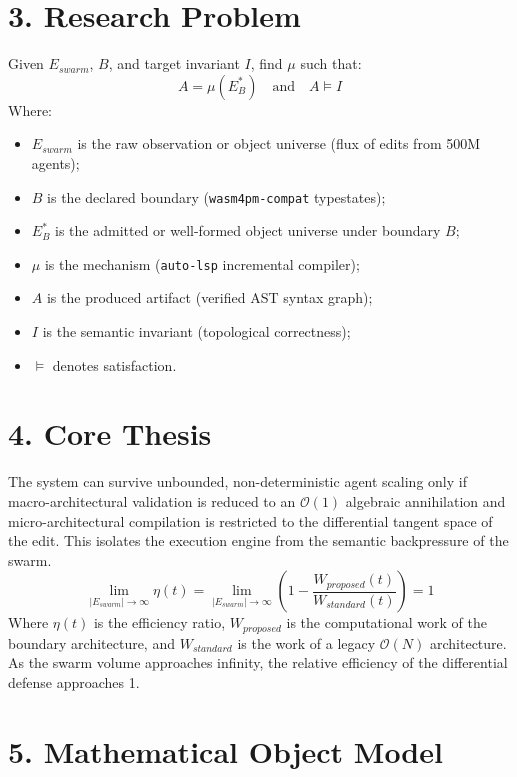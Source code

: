 \section{3. Research Problem}
Given $E_{swarm}$, $B$, and target invariant $I$, find $\mu$ such that:
\begin{equation}
A = \mu(E_B^*) \quad \text{and} \quad A \models I
\end{equation}
Where:
\begin{itemize}
    \item $E_{swarm}$ is the raw observation or object universe (flux of edits from 500M agents);
    \item $B$ is the declared boundary (\texttt{wasm4pm-compat} typestates);
    \item $E_B^*$ is the admitted or well-formed object universe under boundary $B$;
    \item $\mu$ is the mechanism (\texttt{auto-lsp} incremental compiler);
    \item $A$ is the produced artifact (verified AST syntax graph);
    \item $I$ is the semantic invariant (topological correctness);
    \item $\models$ denotes satisfaction.
\end{itemize}

\section{4. Core Thesis}
The system can survive unbounded, non-deterministic agent scaling only if macro-architectural validation is reduced to an $\mathcal{O}(1)$ algebraic annihilation and micro-architectural compilation is restricted to the differential tangent space of the edit. This isolates the execution engine from the semantic backpressure of the swarm.
\begin{equation}
\lim_{|E_{swarm}| \to \infty} \eta(t) = \lim_{|E_{swarm}| \to \infty} \left( 1 - \frac{W_{proposed}(t)}{W_{standard}(t)} \right) = 1
\end{equation}
Where $\eta(t)$ is the efficiency ratio, $W_{proposed}$ is the computational work of the boundary architecture, and $W_{standard}$ is the work of a legacy $\mathcal{O}(N)$ architecture. As the swarm volume approaches infinity, the relative efficiency of the differential defense approaches 1.

\section{5. Mathematical Object Model}


